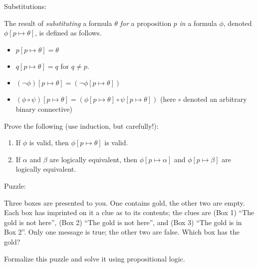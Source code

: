 \bigskip
\noindent
{\sf Substitutions}:

The result of {\em substituting\/} a formula $\theta$
{\em for\/} a proposition $p$ {\em in\/} a formula $\phi$,
denoted $\phi[p \mapsto \theta]$, is defined as follows.
\begin{itemize}
\item
$p[p \mapsto \theta]=\theta$
\item
$q[p \mapsto \theta]=q$ for $q \ne p$.
\item
$(\neg\phi)[p \mapsto \theta]=(\neg\phi[p \mapsto \theta])$
\item
$(\phi \circ \psi)[p \mapsto \theta]=
(\phi [p \mapsto \theta] \circ \psi [p \mapsto \theta])$
(here $\circ$ denoted an arbitrary binary connective)
\end{itemize}
Prove the following (use induction, but carefully!):
\begin{enumerate}
\item
If $\phi$ is valid, then $\phi[p \mapsto \theta]$ is valid.
\item
If $\alpha$ and $\beta$ are logically equivalent, then
$\phi[p \mapsto \alpha]$ and
$\phi[p \mapsto \beta]$ are logically equivalent.
\end{enumerate}

\bigskip
\noindent
{\sf Puzzle}:

Three boxes are presented to you. One contains gold, the other two
are empty. Each box has imprinted on it a clue as to its contents;
the clues are (Box 1) ``The gold is not here'', 
(Box 2) ``The gold is not here'', and 
(Box 3) ``The gold is in Box 2''.  Only one message is true; 
the other two are false. Which box has the gold?

Formalize this puzzle and solve it using propositional logic.


